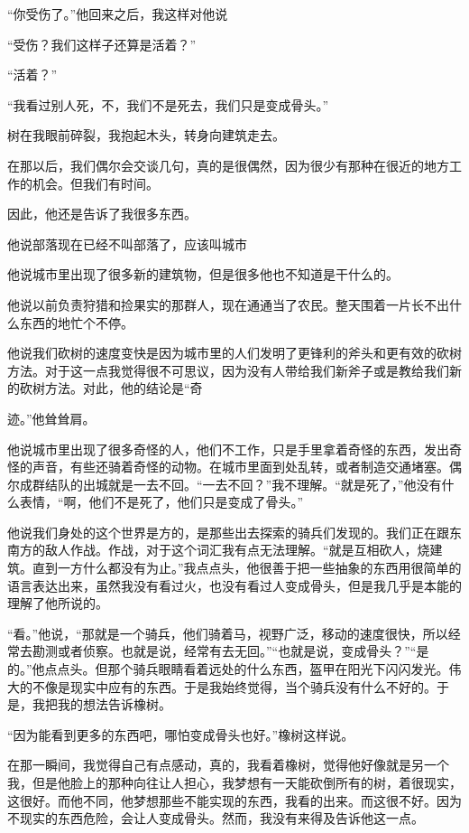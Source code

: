 \documentclass{article}
\begin{document}
“你受伤了。”他回来之后，我这样对他说

“受伤？我们这样子还算是活着？”

“活着？”

“我看过别人死，不，我们不是死去，我们只是变成骨头。”

树在我眼前碎裂，我抱起木头，转身向建筑走去。


在那以后，我们偶尔会交谈几句，真的是很偶然，因为很少有那种在很近的地方工作的机会。但我们有时间。

因此，他还是告诉了我很多东西。

他说部落现在已经不叫部落了，应该叫城市

他说城市里出现了很多新的建筑物，但是很多他也不知道是干什么的。

他说以前负责狩猎和捡果实的那群人，现在通通当了农民。整天围着一片长不出什么东西的地忙个不停。

他说我们砍树的速度变快是因为城市里的人们发明了更锋利的斧头和更有效的砍树方法。对于这一点我觉得很不可思议，因为没有人带给我们新斧子或是教给我们新的砍树方法。对此，他的结论是“奇

\newpage 

迹。”他耸耸肩。

他说城市里出现了很多奇怪的人，他们不工作，只是手里拿着奇怪的东西，发出奇怪的声音，有些还骑着奇怪的动物。在城市里面到处乱转，或者制造交通堵塞。偶尔成群结队的出城就是一去不回。“一去不回？”我不理解。“就是死了，”他没有什么表情，“啊，他们不是死了，他们只是变成了骨头。”

他说我们身处的这个世界是方的，是那些出去探索的骑兵们发现的。我们正在跟东南方的敌人作战。作战，对于这个词汇我有点无法理解。“就是互相砍人，烧建筑。直到一方什么都没有为止。”我点点头，他很善于把一些抽象的东西用很简单的语言表达出来，虽然我没有看过火，也没有看过人变成骨头，但是我几乎是本能的理解了他所说的。

“看。”他说，“那就是一个骑兵，他们骑着马，视野广泛，移动的速度很快，所以经常去勘测或者侦察。也就是说，经常有去无回。”“也就是说，变成骨头？”“是的。”他点点头。但那个骑兵眼睛看着远处的什么东西，盔甲在阳光下闪闪发光。伟大的不像是现实中应有的东西。于是我始终觉得，当个骑兵没有什么不好的。于是，我把我的想法告诉橡树。

\newpage 



“因为能看到更多的东西吧，哪怕变成骨头也好。”橡树这样说。

在那一瞬间，我觉得自己有点感动，真的，我看着橡树，觉得他好像就是另一个我，但是他脸上的那种向往让人担心，我梦想有一天能砍倒所有的树，着很现实，这很好。而他不同，他梦想那些不能实现的东西，我看的出来。而这很不好。因为不现实的东西危险，会让人变成骨头。然而，我没有来得及告诉他这一点。
\end{document}
